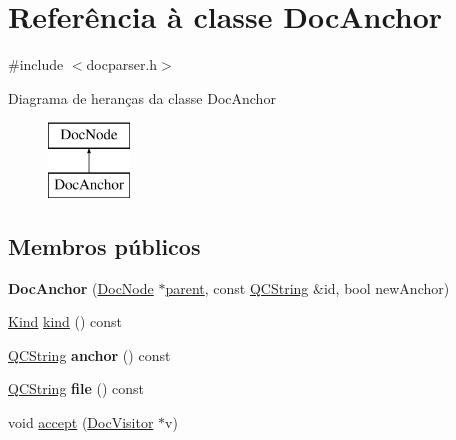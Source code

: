 \hypertarget{class_doc_anchor}{\section{Referência à classe Doc\-Anchor}
\label{class_doc_anchor}
}


{\ttfamily \#include $<$docparser.\-h$>$}

Diagrama de heranças da classe Doc\-Anchor\begin{figure}[H]
\begin{center}
\leavevmode
\includegraphics[height=2.000000cm]{class_doc_anchor}
\end{center}
\end{figure}
\subsection*{Membros públicos}
\begin{DoxyCompactItemize}
\item 
\hypertarget{class_doc_anchor_a703281c1ff8797d8be34b442fcd6d1fe}{{\bfseries Doc\-Anchor} (\hyperlink{class_doc_node}{Doc\-Node} $\ast$\hyperlink{class_doc_node_abd7f070d6b0a38b4da71c2806578d19d}{parent}, const \hyperlink{class_q_c_string}{Q\-C\-String} \&id, bool new\-Anchor)}\label{class_doc_anchor_a703281c1ff8797d8be34b442fcd6d1fe}

\item 
\hyperlink{class_doc_node_aa10c9e8951b8ccf714a59ec321bdac5b}{Kind} \hyperlink{class_doc_anchor_aa9d037bed9f9a083d0cd01485637d843}{kind} () const 
\item 
\hypertarget{class_doc_anchor_acd17ae1d9600f864b1beb85dfb99a4f4}{\hyperlink{class_q_c_string}{Q\-C\-String} {\bfseries anchor} () const }\label{class_doc_anchor_acd17ae1d9600f864b1beb85dfb99a4f4}

\item 
\hypertarget{class_doc_anchor_aeaa8cdb0fbabc1058b7d3813f2fd223b}{\hyperlink{class_q_c_string}{Q\-C\-String} {\bfseries file} () const }\label{class_doc_anchor_aeaa8cdb0fbabc1058b7d3813f2fd223b}

\item 
void \hyperlink{class_doc_anchor_a7ba716e854ae2f8f87a4eb2140e302b6}{accept} (\hyperlink{class_doc_visitor}{Doc\-Visitor} $\ast$v)
\end{DoxyCompactItemize}
